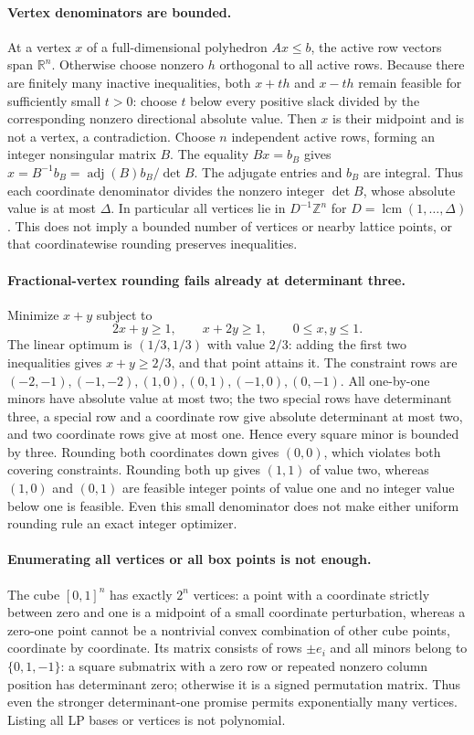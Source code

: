 \documentclass[11pt]{article}
\begin{document}
\paragraph{Vertex denominators are bounded.}
At a vertex $x$ of a full-dimensional polyhedron $Ax\le b$,
the active row vectors span $\mathbb R^n$. Otherwise choose
nonzero $h$ orthogonal to all active rows. Because there are finitely
many inactive inequalities, both $x+th$ and $x-th$ remain
feasible for sufficiently small $t>0$: choose $t$ below every
positive slack divided by the corresponding nonzero directional
absolute value. Then $x$ is their midpoint and is not a vertex,
a contradiction. Choose $n$ independent active rows, forming an
integer nonsingular matrix $B$. The equality $Bx=b_B$ gives
$x=B^{-1}b_B=\operatorname{adj}(B)b_B/\det B$.
The adjugate entries and $b_B$ are integral. Thus each coordinate
denominator divides the nonzero integer $\det B$, whose absolute
value is at most $\Delta$. In particular all vertices lie in
$D^{-1}\mathbb Z^n$ for $D=\operatorname{lcm}(1,\ldots,\Delta)$.
This does not imply a bounded number of vertices or nearby lattice
points, or that coordinatewise rounding preserves inequalities.

\paragraph{Fractional-vertex rounding fails already at determinant three.}
Minimize $x+y$ subject to
\[
2x+y\ge1,\qquad x+2y\ge1,\qquad0\le x,y\le1.
\]
The linear optimum is $(1/3,1/3)$ with value $2/3$:
adding the first two inequalities gives $x+y\ge2/3$,
and that point attains it. The constraint rows are
$(-2,-1),(-1,-2),(1,0),(0,1),(-1,0),(0,-1)$.
All one-by-one minors have absolute value at most two; the
two special rows have determinant three, a special row and a
coordinate row give absolute determinant at most two, and two
coordinate rows give at most one. Hence every square minor is
bounded by three. Rounding both coordinates down gives $(0,0)$,
which violates both covering constraints. Rounding both up gives
$(1,1)$ of value two, whereas $(1,0)$ and $(0,1)$ are
feasible integer points of value one and no integer value below
one is feasible. Even this small denominator does not make either
uniform rounding rule an exact integer optimizer.

\paragraph{Enumerating all vertices or all box points is not enough.}
The cube $[0,1]^n$ has exactly $2^n$ vertices: a point with
a coordinate strictly between zero and one is a midpoint of a
small coordinate perturbation, whereas a zero-one point cannot be
a nontrivial convex combination of other cube points, coordinate
by coordinate. Its matrix consists of rows $\pm e_i$ and
all minors belong to $\{0,1,-1\}$: a square submatrix with
a zero row or repeated nonzero column position has determinant
zero; otherwise it is a signed permutation matrix. Thus even
the stronger determinant-one promise permits exponentially many
vertices. Listing all LP bases or vertices is not polynomial.
\end{document}
